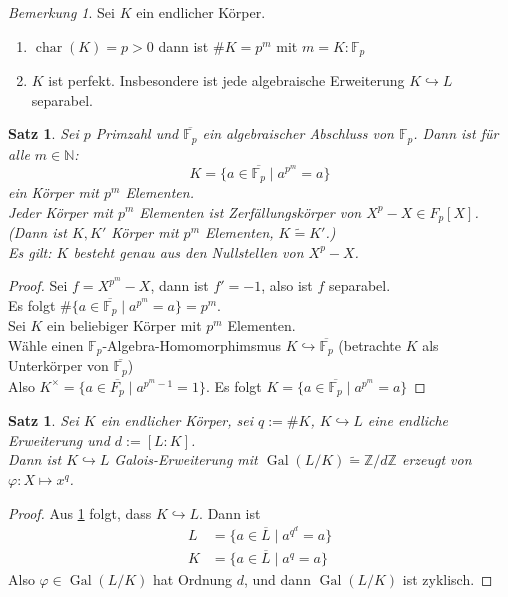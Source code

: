 \documentclass[10pt,a4paper]{article}
\newcommand{\N}{\ensuremath{\mathbb{N}}}
\newcommand{\Z}{\ensuremath{\mathbb{Z}}}
\newcommand{\F}{\ensuremath{\mathbb{F}}}
\newcommand{\ol}[1]{\overline{#1}}
\newcommand{\isomorph}{\ensuremath{\tilde{=}}}
\newcommand{\cha}{\ensuremath{\operatorname{char}}}
\newcommand{\Gal}{\ensuremath{\operatorname{Gal}}}
\newcounter{thm}[section]
\theoremstyle{definition}
\theoremstyle{plain}
\newtheorem{satz}[thm]{Satz}
\theoremstyle{remark}
\newtheorem{bem}[thm]{Bemerkung}
\begin{document}
\begin{bem}
	Sei $K$ ein endlicher Körper.
	\begin{enumerate}
		\item $\cha(K)=p>0$ dann ist $\#K=p^m$ mit $m=K:\F_p$
		\item $K$ ist perfekt. Insbesondere ist jede algebraische Erweiterung $K\hookrightarrow L$ separabel.
	\end{enumerate}
\end{bem}

\begin{satz}\label{1102satz}
	Sei $p$ Primzahl und $\ol{\F_p}$ ein algebraischer Abschluss von $\F_p$. Dann ist für alle $m\in\N$:
	\[K=\{a\in\ol{\F_p}\mid a^{p^m}=a\}\]
	ein Körper mit $p^m$ Elementen.\\
	Jeder Körper mit $p^m$ Elementen ist Zerfällungskörper von $X^p-X\in F_p[X]$. (Dann ist $K,K'$ Körper mit $p^m$ Elementen, $K\isomorph K'$.)\\
	Es gilt: $K$ besteht genau aus den Nullstellen von $X^p-X$.
\end{satz}
\begin{proof}
	Sei $f=X^{p^m}-X$, dann ist $f'=-1$, also ist $f$ separabel.\\
	Es folgt $\#\{a\in\ol{\F_p}\mid a^{p^m}=a\}=p^m$.\\
	Sei $K$ ein beliebiger Körper mit $p^m$ Elementen.\\
	Wähle einen $\F_p$-Algebra-Homomorphimsmus $K\hookrightarrow\ol{\F_p}$ (betrachte $K$ als Unterkörper von $\ol{\F_p}$)\\
	Also $K^\times=\{a\in\ol{F_p}\mid a^{p^m-1}=1\}$. Es folgt $K=\{a\in\ol{\F_p}\mid a^{p^m}=a\}$
\end{proof}

\begin{satz}
	Sei $K$ ein endlicher Körper, sei $q:=\#K$, $K\hookrightarrow L$ eine endliche Erweiterung und $d:=[L:K]$.\\
	Dann ist $K\hookrightarrow L$ Galois-Erweiterung mit $\Gal(L/K)\isomorph\Z/d\Z$ erzeugt von $\varphi:X\mapsto x^q$.
\end{satz}
\begin{proof}
	Aus \ref{1102satz} folgt, dass $K\hookrightarrow L$. Dann ist
	\begin{align*}
	L&=\{a\in\ol L\mid a^{q^d}=a\}\\
	K&=\{a\in\ol L\mid a^q=a\}
	\end{align*}
	Also $\varphi\in\Gal(L/K)$ hat Ordnung $d$, und dann $\Gal(L/K)$ ist zyklisch.
\end{proof}
\end{document}
